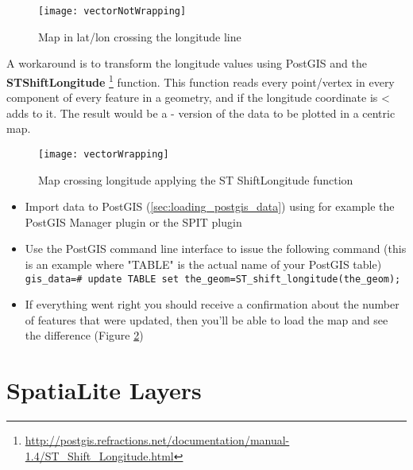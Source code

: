 \begin{figure}[ht]
   \centering
   \texttt{[image: vectorNotWrapping]}
      \caption{Map in lat/lon crossing the  longitude line \nixcaption}
   \label{fig:vector_not_wrapping}
\end{figure}

A workaround is to transform the longitude values using PostGIS and the
\textbf{ST\textunderscore Shift\textunderscore Longitude}
\footnote{\url{http://postgis.refractions.net/documentation/manual-1.4/ST\_Shift\_Longitude.html}}
function. This function reads every point/vertex in every component of every
feature in a geometry, and if the longitude coordinate is <  adds
 to it. The result would be a  -  version of
the data to be plotted in a  centric map.

\begin{figure}[ht]
   \centering
   \texttt{[image: vectorWrapping]}
   \caption{Map crossing  longitude applying the ST\textunderscore 
   Shift\textunderscore Longitude function \nixcaption}
\label{fig:vector_wrapping}
\end{figure}


\begin{itemize}[label=--]
\item Import data to PostGIS (\ref{sec:loading_postgis_data}) using for
example the PostGIS Manager plugin or the SPIT plugin
\item Use the PostGIS command line interface to issue the following command
(this is an example where "TABLE" is the actual name of your PostGIS table) \\
\texttt{gis\_data=\# update TABLE set the\_geom=ST\_shift\_longitude(the\_geom);}
\item If everything went right you should receive a confirmation about the
number of features that were updated, then you'll be able to load the map and
see the difference (Figure \ref{fig:vector_wrapping})
\end{itemize}

\section{SpatiaLite Layers}
\label{label_spatialite}

